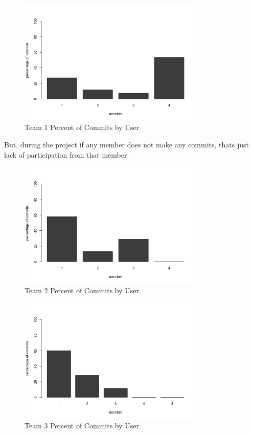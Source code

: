\documentclass[conference]{IEEEtran}
\begin{document}
\begin{figure}[H]
    \centering
    \includegraphics[width=9cm]{../AprilProject/pic/users commit percentage team1.png}
    \caption{Team 1 Percent of Commits by User}
    \label{team1_percent_commit}
\end{figure}

But, during the project if any member does not make any commits, thats just lack of participation from that member.

\begin{figure}[H]
    \centering
    \includegraphics[width=9cm]{../AprilProject/pic/users commit percentage team2.png}
    \caption{Team 2 Percent of Commits by User}
    \label{team2_percent_commit}
\end{figure}

\begin{figure}[H]
    \centering
    \includegraphics[width=9cm]{../AprilProject/pic/users commit percentage team3.png}
    \caption{Team 3 Percent of Commits by User}
    \label{team3_percent_commit}
\end{figure}
\end{document}
